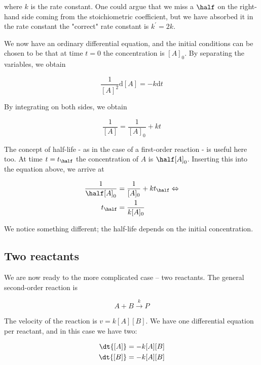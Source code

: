 where $k$ is the rate constant. One could argue that we miss a $\half$ on the right-hand side coming from the stoichiometric coefficient, but we have absorbed it in the rate constant \ie the "correct" rate constant is $k^\prime = 2k$.

We now have an ordinary differential equation, and the initial conditions can be chosen to be that at time $t = 0$ the concentration is $[A]_0$. By separating the variables, we obtain

\begin{equation}
  \frac{1}{[A]^2} \mathrm{d}[A] = -k\mathrm{d}t
\end{equation}

By integrating on both sides, we obtain

\begin{equation}
  \frac{1}{[A]} = \frac{1}{[A]_0} + kt
\end{equation}

The concept of half-life - as in the case of a first-order reaction - is useful here too. At time $t = t_{\half}$ the concentration of $A$ is $\half[A]_0$. Inserting this into the equation above, we arrive at

\begin{align}
  \frac{1}{\half[A]_0} &= \frac{1}{[A]_0} + kt_{\half} \Leftrightarrow \nonumber  \\
  t_{\half} &= \frac{1}{k[A]_0}
\end{align}

We notice something different; the half-life depends on the initial concentration.

\subsection{Two reactants}

We are now ready to the more complicated case -- two reactants. The general second-order reaction is

\begin{equation}
  \label{eq:secondOrder}
  A + B \overset{k}{\rightarrow} P
\end{equation}

The velocity of the reaction is $v = k[A][B]$. We have one differential equation per reactant, and in this case we have two:

\begin{subequations}
  \label{eq:secondOrderTwoReactants}
\begin{align}
  \dt{[A]} &= -k[A][B] \\
  \dt{[B]} &= -k[A][B]
\end{align}
\end{subequations}

